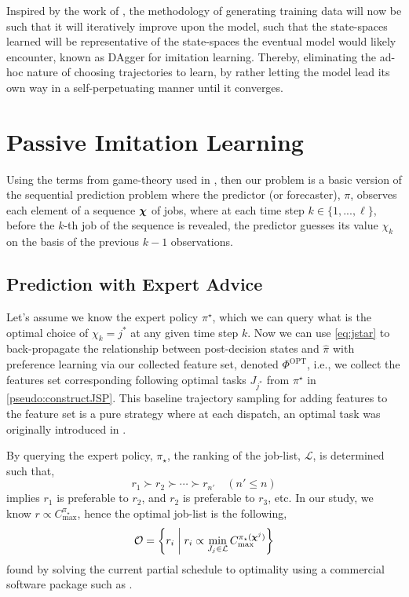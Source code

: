 \documentclass[smallextended]{svjour3}
\begin{document}
Inspired by the work of \cite{RossB10,RossGB11}, the methodology of generating 
training data will now be such that it will iteratively improve upon the model, 
such that the state-spaces learned will be representative of the state-spaces 
the eventual model would likely encounter, known as DAgger for imitation 
learning.
Thereby, eliminating the ad-hoc nature of choosing trajectories to learn, by 
rather letting the model lead its own way in a self-perpetuating manner until 
it converges.

\section{Passive Imitation Learning}
Using the terms from game-theory used in \cite{CesaBianchi06}, %
then our problem is a basic version of the sequential prediction problem where 
the predictor (or forecaster), $\pi$, observes each element of a sequence 
$\bm \chi$ of jobs, where at each time step $k \in \{1,...,\ell\}$, before the 
$k$-th job of the sequence is revealed, the predictor guesses its value 
$\chi_k$ on the basis of the previous $k-1$ observations. 

\subsection{Prediction with Expert Advice}\label{sec:expertPolicy}
Let's assume we know the expert policy $\pi^\star$, which we can query what 
is the optimal choice of $\chi_k={j^*}$ at any given time step $k$. 
Now we can use \cref{eq:jstar} to back-propagate the relationship between 
post-decision states and $\hat{\pi}$ with preference learning via our collected 
feature set, denoted $\Phi^\text{OPT}$, i.e., we collect the features set 
corresponding following optimal tasks $J_{j^*}$ from $\pi^\star$ in 
\cref{pseudo:constructJSP}.
This baseline trajectory sampling for adding features to the feature set 
is a pure strategy where at each dispatch, an optimal task was originally 
introduced in \cite{InRu11a}.

By querying the expert policy, $\pi_\star$, the ranking of the job-list, 
$\mathcal{L}$, is determined such that,
\begin{equation}
r_1 \succ r_2 \succ \cdots \succ r_{n'} \quad (n' \leq n)
\end{equation}
implies $r_1$  is preferable to $r_2$, and $r_2$ is preferable to $r_3$, etc. 
In  our study, we know $r \propto C_{\max}^{\pi_\star}$, hence the optimal 
job-list is the following, 
\begin{equation}
\mathcal{O}=\left\{r_i\;\middle|\;r_i \propto \min_{J_j \in \mathcal{L}} 
  C_{\max}^{\pi_\star(\bm \chi^j)}\right\}
\end{equation}
found by solving the current partial schedule to optimality using a 
commercial software package such as \cite{gurobi}. 
\end{document}
